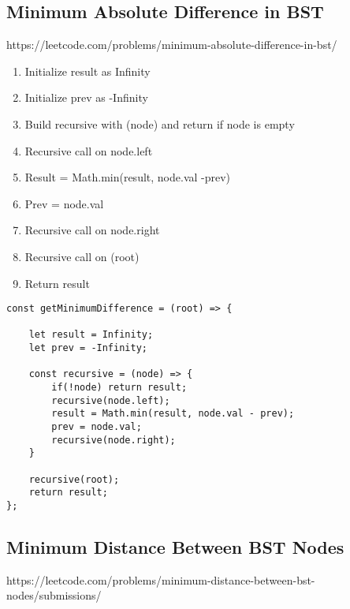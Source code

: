 \documentclass[10pt]{article}
\begin{document}
\medskip %















\pagebreak
\medskip   
\subsection {Minimum Absolute Difference in BST}
https://leetcode.com/problems/minimum-absolute-difference-in-bst/

\begin{enumerate}
	\item Initialize result as Infinity
	\item Initialize prev as -Infinity
	\item Build recursive with (node) and return if node is empty
	\item Recursive call on node.left 
	\item Result = Math.min(result, node.val -prev)
	\item Prev = node.val
	\item Recursive call on node.right
	\item Recursive call on (root)
	\item Return result
\end{enumerate}

\begin{lstlisting}[title=Solution getMinimumDifference, captionpos=t]
const getMinimumDifference = (root) => {
    
    let result = Infinity;
    let prev = -Infinity;
    
    const recursive = (node) => {
        if(!node) return result;
        recursive(node.left);
        result = Math.min(result, node.val - prev);
        prev = node.val;
        recursive(node.right);
    }
    
    recursive(root);
    return result;
};
\end{lstlisting}

\medskip %











\pagebreak
\medskip   
\subsection {Minimum Distance Between BST Nodes}
https://leetcode.com/problems/minimum-distance-between-bst-nodes/submissions/
\end{document}
